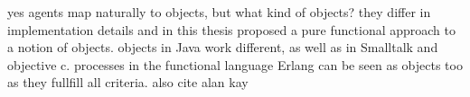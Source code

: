 yes agents map naturally to objects, but what kind of objects? they differ in implementation details and in this thesis proposed a pure functional approach to a notion of objects. objects in Java work different, as well as in Smalltalk and objective c. processes in the functional language Erlang can be seen as objects too as they fullfill all criteria. also cite alan kay
